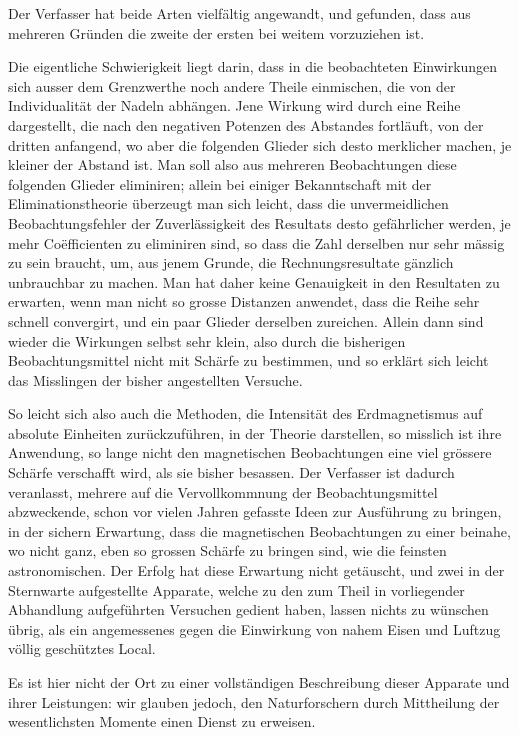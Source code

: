 Der Verfasser hat beide Arten vielfältig angewandt, und gefunden, dass
aus mehreren Gründen die zweite der ersten bei weitem vorzuziehen ist.

Die eigentliche Schwierigkeit liegt darin, dass in die beobachteten
Einwirkungen sich ausser dem Grenzwerthe noch andere Theile einmischen,
die von der Individualität der Nadeln abhängen. Jene Wirkung wird durch
eine Reihe dargestellt, die nach den negativen Potenzen des Abstandes
fortläuft, von der dritten anfangend, wo aber die folgenden Glieder sich
desto merklicher machen, je kleiner der Abstand ist. Man soll also aus
mehreren Beobachtungen diese folgenden Glieder eliminiren; allein bei
einiger Bekanntschaft mit der Eliminationstheorie überzeugt man sich
leicht, dass die unvermeidlichen Beobachtungsfehler der Zuverlässigkeit
des Resultats desto gefährlicher werden, je mehr Coëfficienten zu
eliminiren sind, so dass die Zahl derselben nur sehr mässig zu sein
braucht, um, aus jenem Grunde, die Rechnungsresultate gänzlich unbrauchbar
\clearpage
{}
\noindent
zu machen. Man hat daher keine Genauigkeit in den Resultaten zu erwarten,
wenn man nicht so grosse Distanzen anwendet, dass die Reihe sehr schnell
convergirt, und ein paar Glieder derselben zureichen. Allein dann sind
wieder die Wirkungen selbst sehr klein, also durch die bisherigen
Beobachtungsmittel nicht mit Schärfe zu bestimmen, und so erklärt sich
leicht das Misslingen der bisher angestellten Versuche.

So leicht sich also auch die Methoden, die Intensität des Erdmagnetismus
auf absolute Einheiten zurückzuführen, in der Theorie darstellen, so
misslich ist ihre Anwendung, so lange nicht den magnetischen Beobachtungen
eine viel grössere Schärfe verschafft wird, als sie bisher besassen.
Der Verfasser ist dadurch veranlasst, mehrere auf die Vervollkommnung
der Beobachtungsmittel abzweckende, schon vor vielen Jahren gefasste
Ideen zur Ausführung zu bringen, in der sichern Erwartung, dass die
magnetischen Beobachtungen zu einer beinahe, wo nicht ganz, eben so
grossen Schärfe zu bringen sind, wie die feinsten astronomischen.
Der Erfolg hat diese Erwartung nicht getäuscht, und zwei in der
Sternwarte aufgestellte Apparate, welche zu den zum Theil in vorliegender
Abhandlung aufgeführten Versuchen gedient haben, lassen nichts zu
wünschen übrig, als ein angemessenes gegen die Einwirkung von nahem
Eisen und Luftzug völlig geschütztes Local.

Es ist hier nicht der Ort zu einer vollständigen Beschreibung dieser
Apparate und ihrer Leistungen: wir glauben jedoch, den Naturforschern
durch Mittheilung der wesentlichsten Momente einen Dienst zu erweisen.

